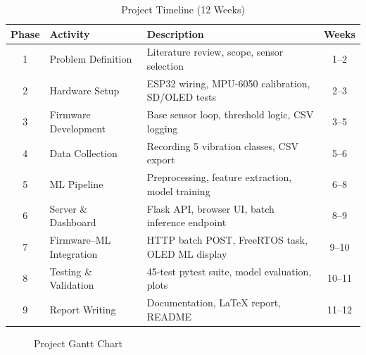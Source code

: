 \documentclass[12pt,a4paper]{report}
\begin{document}
\begin{table}[H]
  \centering
  \caption{Project Timeline (12 Weeks)}
  \label{tab:gantt}
  \begin{tabularx}{\textwidth}{clXc}
    \toprule
    \textbf{Phase} & \textbf{Activity} & \textbf{Description} & \textbf{Weeks} \\
    \midrule
    1 & Problem Definition     & Literature review, scope, sensor selection         & 1--2  \\
    2 & Hardware Setup         & ESP32 wiring, MPU-6050 calibration, SD/OLED tests  & 2--3  \\
    3 & Firmware Development   & Base sensor loop, threshold logic, CSV logging     & 3--5  \\
    4 & Data Collection        & Recording 5 vibration classes, CSV export          & 5--6  \\
    5 & ML Pipeline            & Preprocessing, feature extraction, model training  & 6--8  \\
    6 & Server \& Dashboard    & Flask API, browser UI, batch inference endpoint    & 8--9  \\
    7 & Firmware--ML Integration & HTTP batch POST, FreeRTOS task, OLED ML display  & 9--10 \\
    8 & Testing \& Validation  & 45-test pytest suite, model evaluation, plots      & 10--11 \\
    9 & Report Writing         & Documentation, LaTeX report, README                & 11--12 \\
    \bottomrule
  \end{tabularx}
\end{table}

\begin{figure}[H]
\centering
{}
\caption{Project Gantt Chart}
\label{fig:gantt}
\end{figure}
\end{document}
